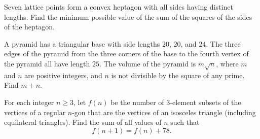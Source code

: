 \begin{question}[name={2016 HMMT, November Theme, \href{https://artofproblemsolving.com/community/c129h1342706p7297978}{Problem 7}}]
	Seven lattice points form a convex heptagon with all sides having distinct lengths. Find the minimum possible value of the sum of the squares of the sides of the heptagon.
\end{question}




%	









\begin{question}[name={2017 AIME I, \href{https://artofproblemsolving.com/community/c4p7812780}{Problem 4}}]
	A pyramid has a triangular base with side lengths $20$, $20$, and $24$. The three edges of the pyramid from the three corners of the base to the fourth vertex of the pyramid all have length $25$. The volume of the pyramid is $m\sqrt{n}$, where $m$ and $n$ are positive integers, and $n$ is not divisible by the square of any prime. Find $m+n$.
\end{question}


%	

















\begin{question}[name={2017 AIME II, \href{https://artofproblemsolving.com/community/c4p7910357}{Problem 13}}]
	For each integer $n\ge 3$, let $f(n)$ be the number of 3-element subsets of the vertices of a regular $n$-gon that are the vertices of an isosceles triangle (including equilateral triangles). Find the sum of all values of $n$ such that $$f(n+1)=f(n)+78.$$
\end{question}


%	













